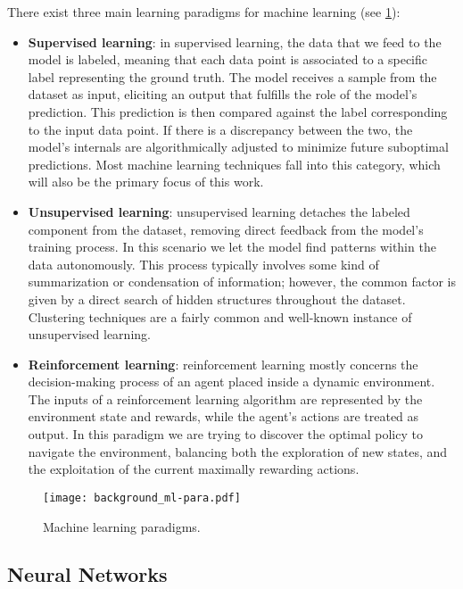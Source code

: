 There exist three main learning paradigms for machine learning (see \cref{fig:background_ml-paradigm}):
\begin{itemize}
    \item \textbf{Supervised learning}: in supervised learning, the data that we feed to the model is labeled, meaning that each data point is associated to a specific label representing the ground truth.
The model receives a sample from the dataset as input, eliciting an output that fulfills the role of the model's prediction.
This prediction is then compared against the label corresponding to the input data point.
If there is a discrepancy between the two, the model's internals are algorithmically adjusted to minimize future suboptimal predictions.
Most machine learning techniques fall into this category, which will also be the primary focus of this work.
    \item \textbf{Unsupervised learning}: unsupervised learning detaches the labeled component from the dataset, removing direct feedback from the model's training process.
In this scenario we let the model find patterns within the data autonomously.
This process typically involves some kind of summarization or condensation of information; however, the common factor is given by a direct search of hidden structures throughout the dataset.
Clustering techniques are a fairly common and well-known instance of unsupervised learning. 
    \item \textbf{Reinforcement learning}: reinforcement learning mostly concerns the decision-making process of an agent placed inside a dynamic environment.
The inputs of a reinforcement learning algorithm are represented by the environment state and rewards, while the agent's actions are treated as output.
In this paradigm we are trying to discover the optimal policy to navigate the environment, balancing both the exploration of new states, and the exploitation of the current maximally rewarding actions.
\end{itemize}

\begin{figure}[t!]
    \centering
    \texttt{[image: background\_ml-para.pdf]}
    \caption{Machine learning paradigms.}
    \label{fig:background_ml-paradigm}
\end{figure}

\subsection{Neural Networks}

